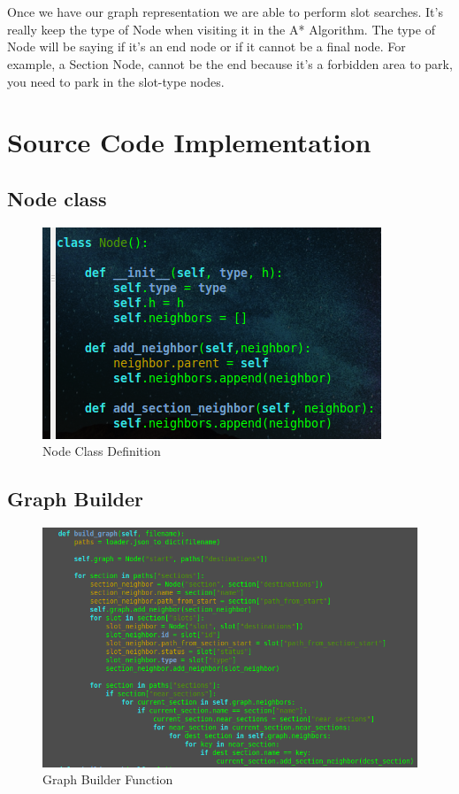 \paragraph{} ~\\
Once we have our graph representation we are able to perform slot searches. It's really keep the type of Node when visiting it in the A* Algorithm. The type 
of Node will be saying if it's an end node or if it cannot be a final node. For example, a Section Node, cannot be the end because it's a forbidden area to park, you 
need to park in the slot-type nodes.

\section{Source Code Implementation}

\subsection{Node class}
\begin{figure}[H]
    \centering
    \includegraphics[width=.7\textwidth]{images/node_class.png}
    \caption{Node Class Definition}
    \label{fig:node_class}
\end{figure}

\subsection{Graph Builder}
\begin{figure}[H]
    \centering
    \includegraphics[width=1\textwidth]{images/graph_builder.png}
    \caption{Graph Builder Function}
    \label{fig:graph_builder}
\end{figure}

